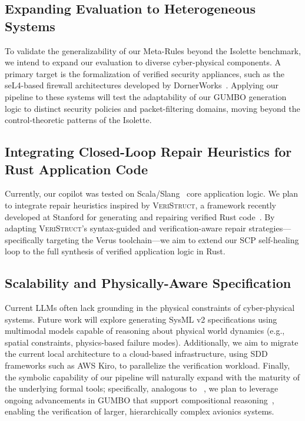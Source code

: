 \documentclass[conference]{IEEEtran}
\begin{document}
\subsection{Expanding Evaluation to Heterogeneous Systems}
To validate the generalizability of our Meta-Rules beyond the Isolette benchmark, we intend to expand our evaluation to diverse cyber-physical components. A primary target is the formalization of verified security appliances, such as the seL4-based firewall architectures developed by DornerWorks~\cite{Hatcliff:seL4Summit2025}. Applying our pipeline to these systems will test the adaptability of our GUMBO generation logic to distinct security policies and packet-filtering domains, moving beyond the control-theoretic patterns of the Isolette.

\subsection{Integrating Closed-Loop Repair Heuristics for Rust Application Code}
Currently, our copilot was tested on Scala/Slang~\cite{slang} core application logic. We plan to integrate repair heuristics inspired by \textsc{VeriStruct}, a framework recently developed at Stanford for generating and repairing verified Rust code~\cite{sun2025veristruct}. By adapting \textsc{VeriStruct}'s syntax-guided and verification-aware repair strategies---specifically targeting the Verus toolchain---we aim to extend our SCP self-healing loop to the full synthesis of verified application logic in Rust.

\subsection{Scalability and Physically-Aware Specification}
Current LLMs often lack grounding in the physical constraints of cyber-physical systems. Future work will explore generating SysML v2 specifications using multimodal models capable of reasoning about physical world dynamics (e.g., spatial constraints, physics-based failure modes). Additionally, we aim to migrate the current local architecture to a cloud-based infrastructure, using SDD frameworks such as AWS Kiro, to parallelize the verification workload. Finally, the symbolic capability of our pipeline will naturally expand with the maturity of the underlying formal tools; specifically, analogous to ~\cite{compositional-analysis-agree,agreedog_tahat2025}, we plan to leverage ongoing advancements in GUMBO that support compositional reasoning~\cite{hamr}, enabling the verification of larger, hierarchically complex avionics systems.
\end{document}
